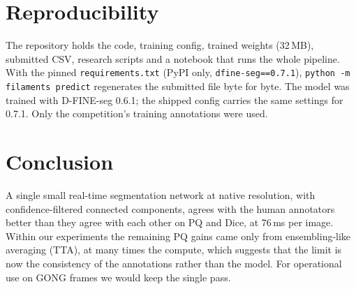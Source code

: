 \documentclass[sigconf]{acmart}
\begin{document}
\section{Reproducibility}
The repository holds the code, training config, trained weights (32\,MB), submitted CSV, research scripts and a notebook that runs the whole pipeline. With the pinned \texttt{requirements.txt} (PyPI only, \texttt{dfine-seg==0.7.1}), \texttt{python -m filaments predict} regenerates the submitted file byte for byte. The model was trained with D-FINE-seg 0.6.1; the shipped config carries the same settings for 0.7.1. Only the competition's training annotations were used.

\section{Conclusion}
A single small real-time segmentation network at native resolution, with confidence-filtered connected components, agrees with the human annotators better than they agree with each other on PQ and Dice, at 76\,ms per image. Within our experiments the remaining PQ gains came only from ensembling-like averaging (TTA), at many times the compute, which suggests that the limit is now the consistency of the annotations rather than the model. For operational use on GONG frames we would keep the single pass.



\end{document}
